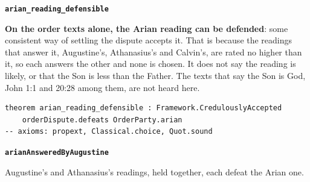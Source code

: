 \documentclass[11pt,paper=\testimonypaper,DIV=13,parskip=false]{scrartcl}
\begin{document}
\par\medskip\noindent\textbf{\texttt{arian\_\allowbreak{}reading\_\allowbreak{}defensible}}\par\nobreak\noindent
\textbf{On the order texts alone, the Arian reading can be defended}: some consistent way of settling the dispute accepts it. That is because the readings that answer it, Augustine’s, Athanasius’s and Calvin’s, are rated no higher than it, so each answers the other and none is chosen. It does not say the reading is likely, or that the Son is less than the Father. The texts that say the Son is God, John 1:1 and 20:28 among them, are not heard here.

{\small\begin{verbatim}
theorem arian_reading_defensible : Framework.CredulouslyAccepted
    orderDispute.defeats OrderParty.arian
-- axioms: propext, Classical.choice, Quot.sound
\end{verbatim}}
\par\medskip\noindent\textbf{\texttt{arian\allowbreak{}Answered\allowbreak{}By\allowbreak{}Augustine}}\par\nobreak\noindent
Augustine’s and Athanasius’s readings, held together, each defeat the Arian one.
\end{document}
